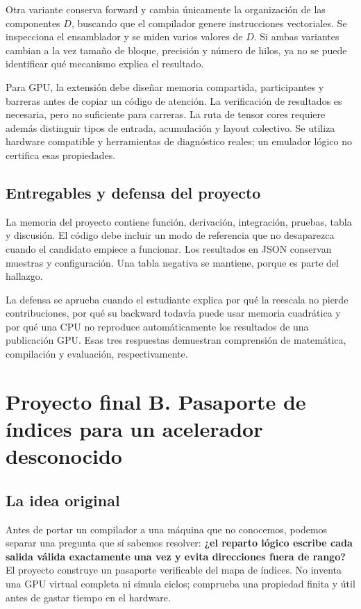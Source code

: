 \documentclass[12pt,a4paper,oneside]{report}
\begin{document}
Otra variante conserva forward y cambia únicamente la organización de las componentes $D$, buscando que el compilador genere instrucciones vectoriales. Se inspecciona el ensamblador y se miden varios valores de $D$. Si ambas variantes cambian a la vez tamaño de bloque, precisión y número de hilos, ya no se puede identificar qué mecanismo explica el resultado.

Para GPU, la extensión debe diseñar memoria compartida, participantes y barreras antes de copiar un código de atención. La verificación de resultados es necesaria, pero no suficiente para carreras. La ruta de tensor cores requiere además distinguir tipos de entrada, acumulación y layout colectivo. Se utiliza hardware compatible y herramientas de diagnóstico reales; un emulador lógico no certifica esas propiedades.

\section{Entregables y defensa del proyecto}
La memoria del proyecto contiene función, derivación, integración, pruebas, tabla y discusión. El código debe incluir un modo de referencia que no desaparezca cuando el candidato empiece a funcionar. Los resultados en JSON conservan muestras y configuración. Una tabla negativa se mantiene, porque es parte del hallazgo.

La defensa se aprueba cuando el estudiante explica por qué la reescala no pierde contribuciones, por qué su backward todavía puede usar memoria cuadrática y por qué una CPU no reproduce automáticamente los resultados de una publicación GPU. Esas tres respuestas demuestran comprensión de matemática, compilación y evaluación, respectivamente.

\chapter{Proyecto final B. Pasaporte de índices para un acelerador desconocido}
\label{project:pasaporte}
\section{La idea original}
Antes de portar un compilador a una máquina que no conocemos, podemos separar una pregunta que sí sabemos resolver: \textbf{¿el reparto lógico escribe cada salida válida exactamente una vez y evita direcciones fuera de rango?} El proyecto construye un pasaporte verificable del mapa de índices. No inventa una GPU virtual completa ni simula ciclos; comprueba una propiedad finita y útil antes de gastar tiempo en el hardware.
\end{document}
